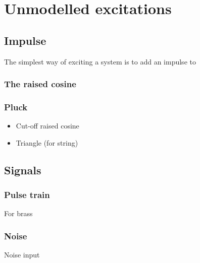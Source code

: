 \chapter{Unmodelled excitations}

\section{Impulse}
The simplest way of exciting a system is to add an impulse to 
\subsection{The raised cosine}


\subsection{Pluck}
\begin{itemize}
    \item Cut-off raised cosine
    \item Triangle (for string)
\end{itemize}

\section{Signals}
\subsection{Pulse train}
For brass

\subsection{Noise}
Noise input